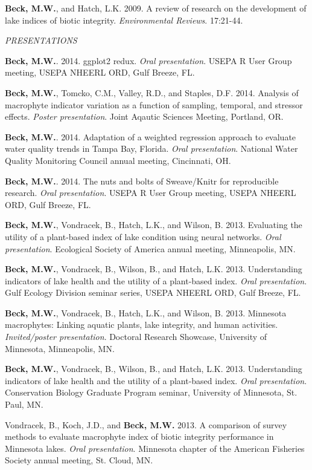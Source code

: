 \documentclass[letterpaper,12pt]{article}
\begin{document}
\textbf{Beck, M.W.}, and Hatch, L.K. 2009. A review of research on the development of lake indices of biotic integrity. \textit{Environmental Reviews}. 17:21-44.

\vspace{\baselineskip} 
\centerline{\large{\textit{PRESENTATIONS}}}

{\bf Beck, M.W.}. 2014. ggplot2 redux. \textit{Oral presentation}. USEPA R User Group meeting, USEPA NHEERL ORD, Gulf Breeze, FL.

{\bf Beck, M.W.}, Tomcko, C.M., Valley, R.D., and Staples, D.F. 2014. Analysis of macrophyte indicator variation as a function of sampling, temporal, and stressor effects. \textit{Poster presentation}. Joint Aqautic Sciences Meeting, Portland, OR.

{\bf Beck, M.W.}. 2014. Adaptation of a weighted regression approach to evaluate water quality trends in {T}ampa {B}ay, {F}lorida. \textit{Oral presentation}. National Water Quality Monitoring Council annual meeting, Cincinnati, OH.

{\bf Beck, M.W.}. 2014. The nuts and bolts of Sweave/Knitr for reproducible research. \textit{Oral presentation}. USEPA R User Group meeting, USEPA NHEERL ORD, Gulf Breeze, FL.

{\bf Beck, M.W.}, Vondracek, B., Hatch, L.K., and Wilson, B. 2013. Evaluating the utility of a plant-based index of lake condition using neural networks. \textit{Oral presentation}. Ecological Society of America annual meeting, Minneapolis, MN.

{\bf Beck, M.W.}, Vondracek, B., Wilson, B., and Hatch, L.K. 2013. Understanding indicators of lake health and the utility of a plant-based index. \textit{Oral presentation}. Gulf Ecology Division seminar series, USEPA NHEERL ORD, Gulf Breeze, FL.

{\bf Beck, M.W.}, Vondracek, B., Hatch, L.K., and Wilson, B. 2013. Minnesota macrophytes: Linking aquatic plants, lake integrity, and human activities. \textit{Invited/poster presentation}. Doctoral Research Showcase, University of Minnesota, Minneapolis, MN.

{\bf Beck, M.W.}, Vondracek, B., Wilson, B., and Hatch, L.K. 2013. Understanding indicators of lake health and the utility of a plant-based index. \textit{Oral presentation}. Conservation Biology Graduate Program seminar, University of Minnesota, St. Paul, MN.

Vondracek, B., Koch, J.D., and {\bf Beck, M.W.} 2013. A comparison of survey methods to evaluate macrophyte index of biotic integrity performance in Minnesota lakes. \textit{Oral presentation}. Minnesota chapter of the American Fisheries Society annual meeting, St. Cloud, MN.
\end{document}
